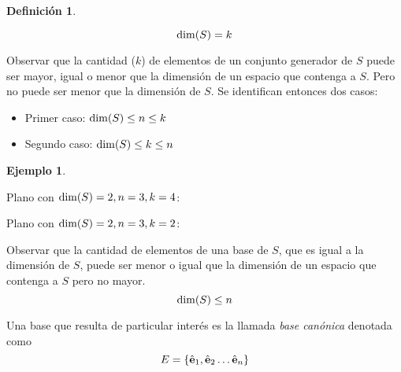 \documentclass[a5paper,12pt,twoside]{book}
\newtheorem{defn}{{Definición}}[chapter]
\newtheorem{example}{{Ejemplo}}[chapter]
\begin{document}
\begin{mdframed}[style=DefinitionFrame]
    \begin{defn}
    \end{defn}
    \begin{equation*}
        \operatorname{dim}(S) = k
    \end{equation*}
\end{mdframed}

Observar que la cantidad ($k$) de elementos de un conjunto generador de $S$ puede ser mayor, igual o menor que la dimensión de un espacio que contenga a $S$.
Pero no puede ser menor que la dimensión de $S$.
Se identifican entonces dos casos:
\begin{itemize}
    \item Primer caso: $\operatorname{dim}(S) \leq n \leq k$
    \item Segundo caso: $\operatorname{dim}(S) \leq k \leq n$
\end{itemize}

\begin{mdframed}[style=ExampleFrame]
    \begin{example}
    \end{example}
    Plano con $\operatorname{dim}(S)=2, n=3, k=4$:

    \begin{center}
        \def\svgwidth{0.6\linewidth}
        
    \end{center}

    Plano con $\operatorname{dim}(S)=2, n=3, k=2$:

    \begin{center}
        \def\svgwidth{0.6\linewidth}
        
    \end{center}
\end{mdframed}

Observar que la cantidad de elementos de una base de $S$, que es igual a la dimensión de $S$, puede ser menor o igual que la dimensión de un espacio que contenga a $S$ pero no mayor.
\begin{equation*}
    \operatorname{dim}(S)\leq n
\end{equation*}

Una base que resulta de particular interés es la llamada \emph{base canónica} denotada como
\begin{equation*}
    E = { \left\{ {\hat{\textbf{e}}_1,\hat{\textbf{e}}_2 \dots \hat{\textbf{e}}_n} \right\} }
\end{equation*}
\end{document}
